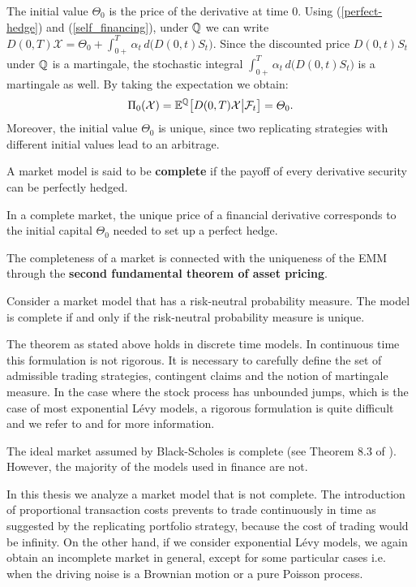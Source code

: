 The initial value $\varTheta_0$ is the price of the derivative at time $0$.
Using (\ref{perfect-hedge}) and (\ref{self_financing}), under $\mathbb{Q}$ we can write  
$D(0,T) \mathcal{X} = \varTheta_0 + \int_{0+}^T \alpha_t \, d\bigr( D(0,t)S_t \bigr)$. Since the discounted price $D(0,t)S_t$ under $\mathbb{Q}$ is a martingale, the stochastic integral  
$\int_{0+}^T \alpha_t \, d\bigr( D(0,t)S_t \bigr)$ is a martingale as well. By taking the expectation we obtain:
\begin{equation}
   \Pi_0(\mathcal{X}) = \mathbb{E}^{\mathbb{Q}} \bigl[ D(0,T) \mathcal{X} \big| \mathcal{F}_t \bigr] = \varTheta_0.
\end{equation}
Moreover, the initial value $\varTheta_0$ is unique, since two replicating strategies with different initial values lead to an arbitrage.
\begin{Definition}
 A market model is said to be \textbf{complete} if the payoff of every derivative security can be perfectly hedged. 
\end{Definition}
In a complete market, the unique price of a financial derivative corresponds to the initial capital $\varTheta_0$ needed to set up a perfect hedge.

The completeness of a market is connected with the uniqueness of the EMM through the
\textbf{second fundamental theorem of asset pricing}.
\begin{Theorem}
 Consider a market model that has a risk-neutral probability measure. The model is complete if and only if the risk-neutral probability measure is unique.
\end{Theorem}
The theorem as stated above holds in discrete time models. In continuous time this formulation is not rigorous. 
It is necessary to carefully define the set of admissible trading strategies, contingent claims and the
notion of martingale measure. 
In the case where the stock process has unbounded jumps, which is the case of most exponential Lévy models, a rigorous formulation is quite difficult
and we refer to \cite{ChSh02} and \cite{Kabanov01} for more information.

The ideal market assumed by Black-Scholes is complete (see Theorem 8.3 of \cite{Bjork}). 
However, the majority of the models used in finance are not.

In this thesis we analyze a market model that is not complete. The introduction of proportional transaction costs prevents to trade continuously in time  
as suggested by the replicating portfolio strategy, because the cost of trading would be infinity.
On the other hand, if we consider exponential Lévy models, we again obtain an incomplete market in general,
except for some particular cases i.e. when the driving noise is a Brownian motion or a pure Poisson process.

